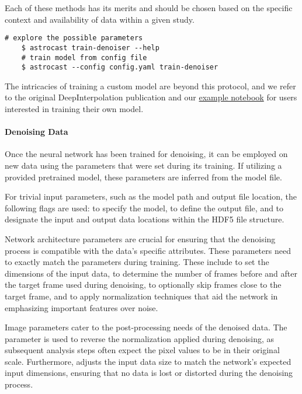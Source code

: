 Each of these methods has its merits and should be chosen based on the specific context and availability of data within a given study.

\begin{lstlisting}[style=bashStyle]
    # explore the possible parameters
    $ astrocast train-denoiser --help
    # train model from config file
    $ astrocast --config config.yaml train-denoiser
\end{lstlisting}

The intricacies of training a custom model are beyond this protocol, and we refer to the original DeepInterpolation
publication\citep{lecoq_removing_2021} and our \href{https://github.com/janreising/astroCAST/blob/8451394bc0d810c4037011f0bcb9cba1f10d1e72/notebooks/examples/train_denoiser_models.ipynb}{example notebook} for users interested in training their own model.


\paragraph{Denoising Data}
Once the neural network has been trained for denoising, it can be employed on new data using the parameters that were set during its training. If utilizing a provided pretrained model, these parameters are inferred from the model file.

For trivial input parameters, such as the model path and output file location, the following flags are used:  to specify the model,  to define the output file,  and  to designate the input and output data locations within the HDF5 file structure.

Network architecture parameters are crucial for ensuring that the denoising process is compatible with the data's specific attributes. These parameters need to exactly match the parameters during training. These include  to set the dimensions of the input data,  to determine the number of frames before and after the target frame used during denoising,  to optionally skip frames close to the target frame, and  to apply normalization techniques that aid the network in emphasizing important features over noise.

Image parameters cater to the post-processing needs of the denoised data. The  parameter is used to reverse the normalization applied during denoising, as subsequent analysis steps often expect the pixel values to be in their original scale. Furthermore,  adjusts the input data size to match the network's expected input dimensions, ensuring that no data is lost or distorted during the denoising process.

